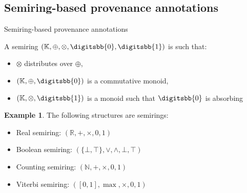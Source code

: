 \documentclass[aspectratio=169]{beamer}
\theoremstyle{definition}
\newtheorem*{exemple}{Example}
\begin{document}

\subsection{Semiring-based provenance annotations}
\begin{frame}{Semiring-based provenance annotations \cite{green-2007,ramusat-prov}}
    \begin{definition}[Semiring]
        A semiring $(\mathbb{K}, \oplus, \otimes, \digitsbb{0}, \digitsbb{1})$ is such that:
        \begin{itemize}[label=--, noitemsep]
            \item $\otimes$ distributes over $\oplus$,
            \item $(\mathbb{K}, \oplus, \digitsbb{0})$ is a commutative monoid,
            \item $(\mathbb{K}, \otimes, \digitsbb{1})$ is a monoid such that $\digitsbb{0}$ is absorbing
        \end{itemize}
    \end{definition}

    \begin{exemple}
        The following structures are semirings:
        \begin{itemize}[label=--, noitemsep]
            \item Real semiring: $(\mathbb{R}, +, \times, 0, 1)$
            \item Boolean semiring: $(\{\bot, \top\}, \lor, \land, \bot, \top)$
            \item Counting semiring: $(\mathbb{N}, +, \times, 0, 1)$
            \item Viterbi semiring: $([0, 1], \max, \times, 0, 1)$
        \end{itemize}
    \end{exemple}
\end{frame}
\end{document}
